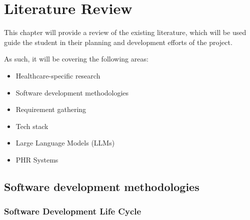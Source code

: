 \chapter{Literature Review}

This chapter will provide a review of the existing literature, which will be used guide the student in their planning and development efforts of the project.

\noindent As such, it will be covering the following areas:
\begin{itemize}
    \item Healthcare-specific research
    \item Software development methodologies
    \item Requirement gathering
    \item Tech stack
    \item Large Language Models (LLMs)
    \item PHR Systems
\end{itemize}

\section{Software development methodologies}

\subsection{Software Development Life Cycle}

